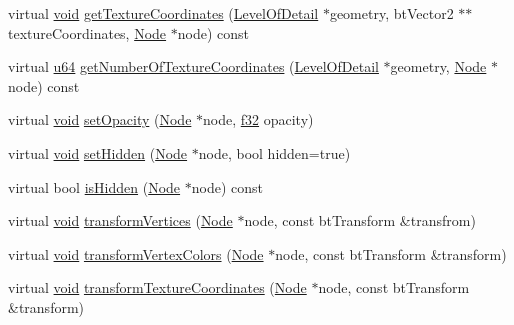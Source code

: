 \begin{DoxyCompactItemize}
\item 
virtual \mbox{\hyperlink{_thread_8h_af1e856da2e658414cb2456cb6f7ebc66}{void}} \mbox{\hyperlink{classnjli_1_1_plane_a55020a9815103781fbe1846cf8b5c81e}{get\+Texture\+Coordinates}} (\mbox{\hyperlink{classnjli_1_1_level_of_detail}{Level\+Of\+Detail}} $\ast$geometry, bt\+Vector2 $\ast$$\ast$texture\+Coordinates, \mbox{\hyperlink{classnjli_1_1_node}{Node}} $\ast$node) const
\item 
virtual \mbox{\hyperlink{_util_8h_ad758b7a5c3f18ed79d2fcd23d9f16357}{u64}} \mbox{\hyperlink{classnjli_1_1_plane_acac9e0af1f82ed239af270c9c50ec4ab}{get\+Number\+Of\+Texture\+Coordinates}} (\mbox{\hyperlink{classnjli_1_1_level_of_detail}{Level\+Of\+Detail}} $\ast$geometry, \mbox{\hyperlink{classnjli_1_1_node}{Node}} $\ast$node) const
\item 
virtual \mbox{\hyperlink{_thread_8h_af1e856da2e658414cb2456cb6f7ebc66}{void}} \mbox{\hyperlink{classnjli_1_1_plane_abf634e87fdc57ec8a9a2965ec24cc34f}{set\+Opacity}} (\mbox{\hyperlink{classnjli_1_1_node}{Node}} $\ast$node, \mbox{\hyperlink{_util_8h_a5f6906312a689f27d70e9d086649d3fd}{f32}} opacity)
\item 
virtual \mbox{\hyperlink{_thread_8h_af1e856da2e658414cb2456cb6f7ebc66}{void}} \mbox{\hyperlink{classnjli_1_1_plane_af6ce772f6604982a03f837f9479e590b}{set\+Hidden}} (\mbox{\hyperlink{classnjli_1_1_node}{Node}} $\ast$node, bool hidden=true)
\item 
virtual bool \mbox{\hyperlink{classnjli_1_1_plane_a3c9fb24d02e80c3f2f91790bed222886}{is\+Hidden}} (\mbox{\hyperlink{classnjli_1_1_node}{Node}} $\ast$node) const
\item 
virtual \mbox{\hyperlink{_thread_8h_af1e856da2e658414cb2456cb6f7ebc66}{void}} \mbox{\hyperlink{classnjli_1_1_plane_aeb45c844627228083af4f2dd4d6b5010}{transform\+Vertices}} (\mbox{\hyperlink{classnjli_1_1_node}{Node}} $\ast$node, const bt\+Transform \&transfrom)
\item 
virtual \mbox{\hyperlink{_thread_8h_af1e856da2e658414cb2456cb6f7ebc66}{void}} \mbox{\hyperlink{classnjli_1_1_plane_a918065b54d466a43fe4c56688a9f0ee2}{transform\+Vertex\+Colors}} (\mbox{\hyperlink{classnjli_1_1_node}{Node}} $\ast$node, const bt\+Transform \&transform)
\item 
virtual \mbox{\hyperlink{_thread_8h_af1e856da2e658414cb2456cb6f7ebc66}{void}} \mbox{\hyperlink{classnjli_1_1_plane_a39afa45eb73d3c9a84d5a814d58ea963}{transform\+Texture\+Coordinates}} (\mbox{\hyperlink{classnjli_1_1_node}{Node}} $\ast$node, const bt\+Transform \&transform)
\item 
$$
\end{DoxyCompactItemize}
